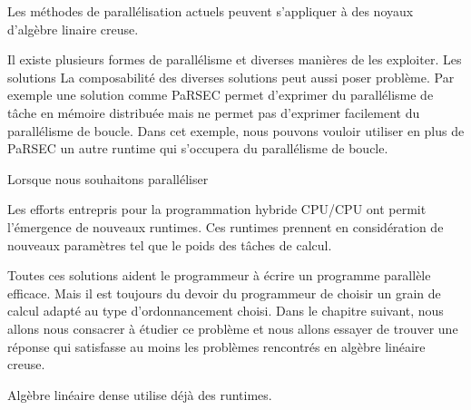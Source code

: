 Les méthodes de parallélisation actuels peuvent s'appliquer à des noyaux d'algèbre linaire creuse.
%






Il existe plusieurs formes de parallélisme et diverses manières de les exploiter.
%
Les solutions
%
La composabilité des diverses solutions peut aussi poser problème.
%
Par exemple une solution comme PaRSEC permet d'exprimer du parallélisme de tâche en mémoire distribuée mais ne permet pas d'exprimer facilement du parallélisme de boucle.
%
Dans cet exemple, nous pouvons vouloir utiliser en plus de PaRSEC un autre runtime qui s'occupera du parallélisme de boucle.
%



Lorsque nous souhaitons paralléliser



Les efforts entrepris pour la programmation hybride CPU/CPU ont permit l'émergence de nouveaux runtimes.
%
Ces runtimes prennent en considération de nouveaux paramètres tel que le poids des tâches de calcul.


Toutes ces solutions aident le programmeur à écrire un programme parallèle efficace.
%
Mais il est toujours du devoir du programmeur de choisir un grain de calcul adapté au type d'ordonnancement choisi.
%
Dans le chapitre suivant, nous allons nous consacrer à étudier ce problème et nous allons essayer de trouver une réponse qui satisfasse au moins les problèmes rencontrés en algèbre linéaire creuse.




Algèbre linéaire dense utilise déjà des runtimes.
